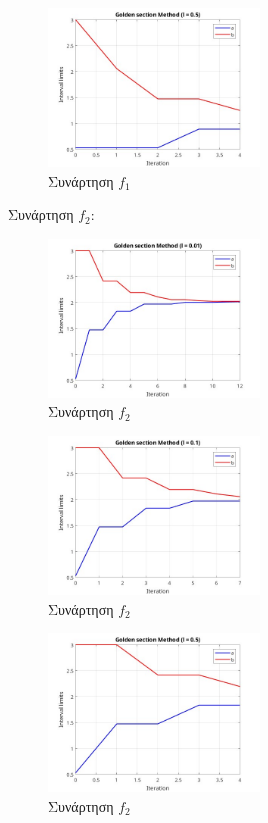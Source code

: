 \begin{figure}[H] %
    \centering
    \includegraphics[width=0.5\textwidth]{media/goldenf1_05} %
    \caption{Συνάρτηση $f_1$}
\end{figure}

Συνάρτηση $f_2$:
\begin{figure}[H] %
    \centering
    \includegraphics[width=0.5\textwidth]{media/goldenf2_001} %
    \caption{Συνάρτηση $f_2$}
\end{figure}
\begin{figure}[H] %
    \centering
    \includegraphics[width=0.5\textwidth]{media/goldenf2_01} %
    \caption{Συνάρτηση $f_2$}
\end{figure}
\begin{figure}[H] %
    \centering
    \includegraphics[width=0.5\textwidth]{media/goldenf2_05} %
    \caption{Συνάρτηση $f_2$}
\end{figure}

